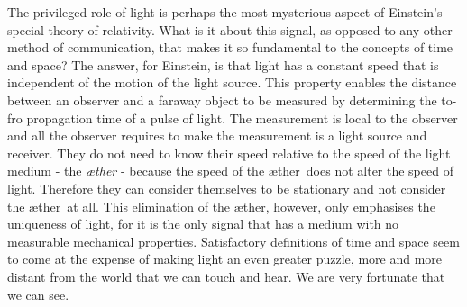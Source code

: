 \documentclass[10pt, fleqn,final,showtrims,oldfontcommands, article,a4paper,oneside]{memoir} %
\newcommand{\aether}{\ae ther}
\begin{document}
The privileged role of light is perhaps the most mysterious aspect of Einstein's special theory of relativity.
What is it about this signal, as opposed to any other method of communication, that makes it  so fundamental to the  concepts of time and space?
The answer, for Einstein, is  that light has a constant speed that  is independent of the motion of the light source\cite{Einstein1905}.
This  property enables the  distance between an observer and a faraway object  to be measured  by determining the to-fro propagation time of a pulse of light.
The measurement is local to the observer and all the observer requires to make the measurement 
 is a light source and receiver. 
They do not need to know their speed relative to the speed of the light medium - the {\em \aether} - because the speed of the \aether\ does not alter the speed of light.
Therefore they can consider themselves to be stationary and not consider the \aether\ at all.
This elimination of the \aether, however, only emphasises the uniqueness of light, for it is the  only  signal that has a  medium with no measurable mechanical properties.
Satisfactory definitions of time and space seem to come at the expense of making light  an even greater puzzle,
more and more distant from the world that we can touch and hear.
We are very fortunate that we can see.
\end{document}

